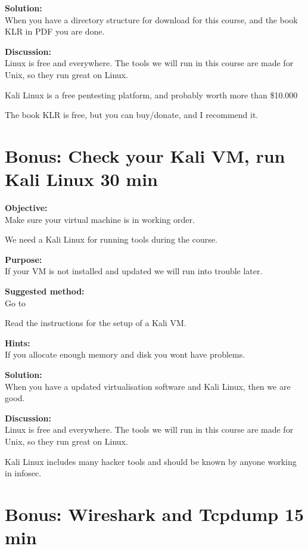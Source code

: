 \documentclass[a4paper,11pt,notitlepage]{report}
\begin{document}
{\bf Solution:}\\
When you have a directory structure for download for this course, and the book KLR in PDF you are done.

{\bf Discussion:}\\
Linux is free and everywhere. The tools we will run in this course are made for Unix, so they run great on Linux.

Kali Linux is a free pentesting platform, and probably worth more than \$10.000

The book KLR is free, but you can buy/donate, and I recommend it.

\chapter{Bonus: Check your Kali VM, run Kali Linux 30 min}
\label{ex:basicVM}


{\bf Objective:}\\
Make sure your virtual machine is in working order.

We need a Kali Linux for running tools during the course.

{\bf Purpose:}\\
If your VM is not installed and updated we will run into trouble later.

{\bf Suggested method:}\\
Go to 

Read the instructions for the setup of a Kali VM.

{\bf Hints:}\\
If you allocate enough memory and disk you wont have problems.

{\bf Solution:}\\
When you have a updated virtualisation software and Kali Linux, then we are good.

{\bf Discussion:}\\
Linux is free and everywhere. The tools we will run in this course are made for Unix, so they run great on Linux.

Kali Linux includes many hacker tools and should be known by anyone working in infosec.




\chapter{Bonus: Wireshark and Tcpdump 15 min}
\label{ex:wireshark-install}
\end{document}
